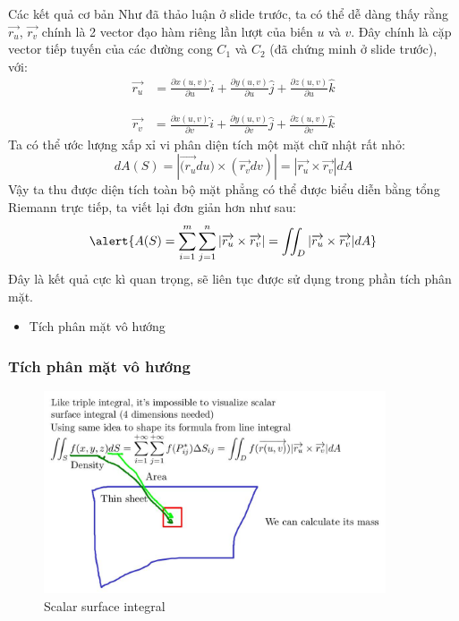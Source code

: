 \documentclass[8pt]{beamer}
\begin{document}
\begin{frame}{Các kết quả cơ bản}
	Như đã thảo luận ở slide trước, ta có thể dễ dàng thấy rằng $\overrightarrow{r_{u}}$, $\overrightarrow{r_{v}}$ chính là 2 vector đạo hàm riêng lần lượt của biến $u$ và $v$. Đây chính là cặp vector tiếp tuyến của các đường cong $C_{1}$ và $C_{2}$ (đã chứng minh ở slide trước), với:
\begin{equation*}
\begin{split}
	\overrightarrow{r_{u}}&=\frac{\partial x(u,v)}{\partial u}\hat i+\frac{\partial y(u,v)}{\partial u}\hat j+\frac{\partial z(u,v)}{\partial u}\hat k
\end{split}
\end{equation*}

\begin{equation*}
\begin{split}
	\overrightarrow{r_{v}}&=\frac{\partial x(u,v)}{\partial v}\hat i+\frac{\partial y(u,v)}{\partial v}\hat j+\frac{\partial z(u,v)}{\partial v}\hat k
\end{split}
\end{equation*}
Ta có thể ước lượng xấp xỉ vi phân diện tích một mặt chữ nhật rất nhỏ:
$$dA(S)=|\overrightarrow{(r_{u}}du)\times(\overrightarrow{r_{v}}dv)|=|\overrightarrow{r_{u}}\times\overrightarrow{r_{v}}|dA$$
Vậy ta thu được diện tích toàn bộ mặt phẳng có thể được biểu diễn bằng tổng Riemann trực tiếp, ta viết lại đơn giản hơn như sau:
$$\alert{A(S)=\sum_{i=1}^{m}\sum_{j=1}^{n}|\overrightarrow{r_{u}}\times\overrightarrow{r_{v}}|=\iint_{D}|\overrightarrow{r_{u}}\times\overrightarrow{r_{v}}|dA}$$
Đây là kết quả cực kì quan trọng, sẽ liên tục được sử dụng trong phần tích phân mặt.
\end{frame}
\begin{frame}
\begin{itemize}
	\item Tích phân mặt vô hướng
\end{itemize}
\subsubsection{Tích phân mặt vô hướng}
\begin{figure}[h]
			\includegraphics[width=0.9\textwidth]{sheet.jpg}
			\caption{Scalar surface integral}			\label{fig:re5}
\end{figure}

\end{frame}
\end{document}
